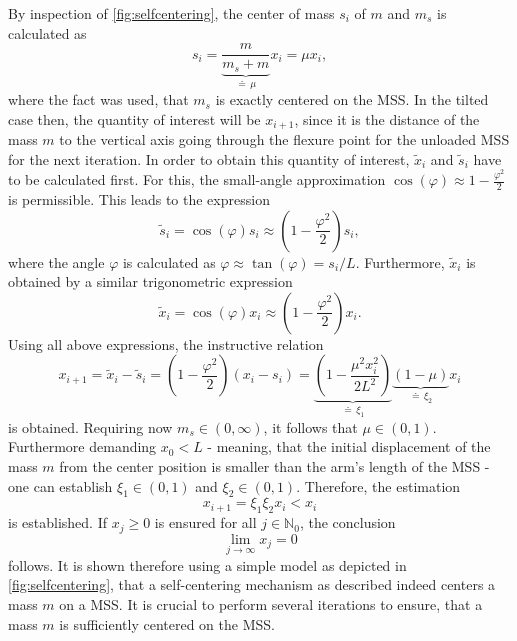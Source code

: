 \documentclass{report}
\numberwithin{tm}{section}
\begin{document}
By inspection of \cref{fig:selfcentering}, the center of mass $s_i$ of $m$ and $m_s$ is calculated as \begin{equation}
	s_i = \underbrace{\frac{m}{m_s+m}}_{\doteq\,\mu}x_i = \mu x_i,
\end{equation} where the fact was used, that $m_s$ is exactly centered on the MSS. In the tilted case then, the quantity of interest will be $x_{i+1}$, since it is the distance of the mass $m$ to the vertical axis going through the flexure point for the unloaded MSS for the next iteration. In order to obtain this quantity of interest, $\tilde{x}_i$ and $\tilde{s}_i$ have to be calculated first. For this, the small-angle approximation $\cos(\varphi) \approx 1- \frac{\varphi^2}{2}$ is permissible. This leads to the expression \begin{equation}
\tilde{s}_i = \cos(\varphi)s_i \approx \left(1-\frac{\varphi^2}{2}\right)s_i,
\end{equation} where the angle $\varphi$ is calculated as $\varphi \approx \tan(\varphi) = s_i/L$. Furthermore, $\tilde{x}_i$ is obtained by a similar trigonometric expression \begin{equation}
\tilde{x}_i = \cos(\varphi)x_i \approx \left(1-\frac{\varphi^2}{2}\right)x_i.
\end{equation} Using all above expressions, the instructive relation \begin{equation}
x_{i+1} = \tilde{x}_i - \tilde{s}_i = \left(1-\frac{\varphi^2}{2}\right)(x_i-s_i) = \underbrace{\left(1-\frac{\mu^2x_i^2}{2L^2}\right)}_{\doteq\, \xi_1}\underbrace{(1-\mu)}_{\doteq\, \xi_2}x_i
\end{equation} is obtained. Requiring now $m_s \in (0,\infty)$, it follows that $\mu \in (0,1)$. Furthermore demanding $x_0 < L$ - meaning, that the initial displacement of the mass $m$ from the center position is smaller than the arm's length of the MSS - one can establish $\xi_1 \in (0,1)$ and $\xi_2 \in (0,1)$. Therefore, the estimation \begin{equation}
x_{i+1} = \xi_1 \xi_2 x_i < x_i
\end{equation} is established. If $x_j \geq 0$ is ensured for all $j \in \mathbb{N}_0$, the conclusion \begin{equation}
\lim_{j \rightarrow \infty} x_{j} = 0
\end{equation} follows. It is shown therefore using a simple model as depicted in \cref{fig:selfcentering}, that a self-centering mechanism as described indeed centers a mass $m$ on a MSS. It is crucial to perform several iterations to ensure, that a mass $m$ is sufficiently centered on the MSS.
\end{document}

